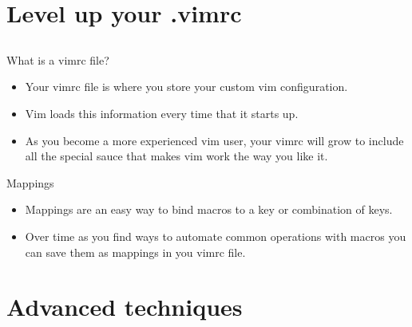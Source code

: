 \documentclass{beamer}
\begin{document}
    \section{Level up your .vimrc}
    \subsection{}
    \begin{frame}{What is a vimrc file?}
        \begin{itemize}
            \item Your vimrc file is where you store your custom vim configuration.
            \item Vim loads this information every time that it starts up.
            \item As you become a more experienced vim user, your vimrc will grow to include all the special sauce that makes vim work the way you like it.
        \end{itemize}
    \end{frame}
    \begin{frame}{Mappings}
        \begin{itemize}
            \item Mappings are an easy way to bind macros to a key or combination of keys.
            \item Over time as you find ways to automate common operations with macros you can save them as mappings in you vimrc file.
        \end{itemize}
    \end{frame}
    \section{Advanced techniques}
\end{document}
